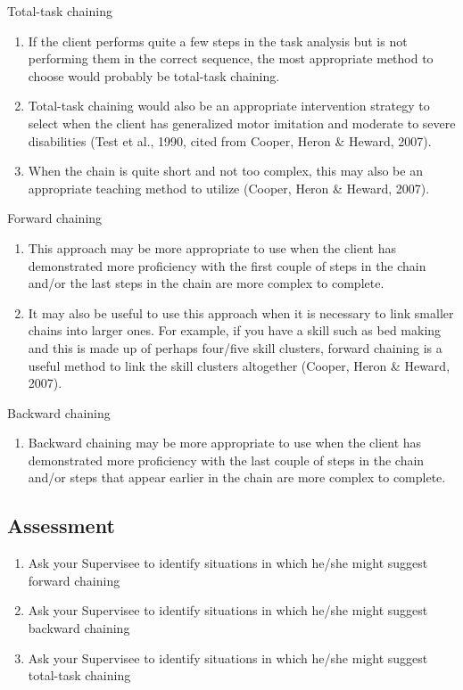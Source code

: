 Total-task chaining
\begin{enumerate}
\item If the client performs quite a few steps in the task analysis but is not performing them in the correct sequence, the most appropriate method to choose would probably be total-task chaining. 
\item Total-task chaining would also be an appropriate intervention strategy to select when the client has generalized motor imitation and moderate to severe disabilities (Test et al., 1990, cited from Cooper, Heron \& Heward, 2007).
\item When the chain is quite short and not too complex, this may also be an appropriate teaching method to utilize (Cooper, Heron \& Heward, 2007).
\end{enumerate}
%
Forward chaining
\begin{enumerate}
\item This approach may be more appropriate to use when the client has demonstrated more proficiency with the first couple of steps in the chain and/or the last steps in the chain are more complex to complete. 
\item It may also be useful to use this approach when it is necessary to link smaller chains into larger ones. For example, if you have a skill such as bed making and this is made up of perhaps four/five skill clusters, forward chaining is a useful method to link the skill clusters altogether (Cooper, Heron \& Heward, 2007).
\end{enumerate}
%
Backward chaining
\begin{enumerate}
\item Backward chaining may be more appropriate to use when the client has demonstrated more proficiency with the last couple of steps in the chain and/or steps that appear earlier in the chain are more complex to complete.
\end{enumerate}
%
\subsection{Assessment}
\begin{enumerate}
\item Ask your Supervisee to identify situations in which he/she might suggest forward chaining
\item Ask your Supervisee to identify situations in which he/she might suggest backward chaining
\item Ask your Supervisee to identify situations in which he/she might suggest total-task chaining
\end{enumerate}
%
